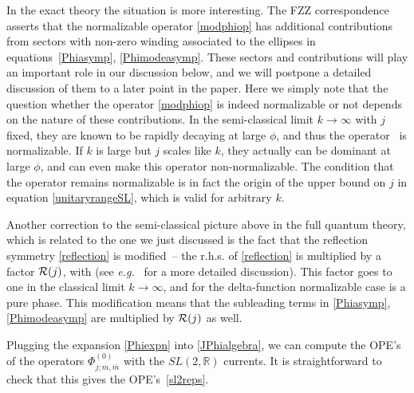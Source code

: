 \documentclass[12pt]{article}
\def\sltwo{\ensuremath{SL(2,\bR)}}
\def\eg{{e.g.}}
\newcommand{\bR}{{\mathbb R}}
\numberwithin{equation}{section}
\def\eg{{\it e.g.}}
\def\eg{{\it e.g.}}
\def\mbar{{\bar m}}
\begin{document}
In the exact theory the situation is more interesting. The FZZ correspondence~ asserts that the normalizable operator \eqref{modphiop} has additional contributions from sectors with non-zero winding associated to the ellipses in equations~\eqref{Phiasymp}, \eqref{Phimodeasymp}. These sectors and contributions will play an important role in our discussion below, and we will postpone a detailed discussion of them to a later point in the paper. Here we simply note that the question whether the operator \eqref{modphiop} is indeed normalizable or not depends on the nature of these contributions. In the semi-classical limit $k\to\infty$ with $j$ fixed, they are known to be rapidly decaying at large $\phi$, and thus the operator \modphiop\ is normalizable. If $k$ is large but $j$ scales like $k$, they actually can be dominant at large $\phi$, and can even make this operator non-normalizable. The condition that the operator remains normalizable is in fact the origin of the upper bound on $j$ in equation \eqref{unitaryrangeSL}, which is valid for arbitrary $k$. 



Another correction to the semi-classical picture above in the full quantum theory, which is related to the one we just discussed is the fact that the reflection symmetry \eqref{reflection} is modified~-- the r.h.s. of \eqref{reflection} is multiplied by a factor $\mathcal {R}(j)$, with
(see \eg~ for a more detailed discussion).
This factor goes to one in the classical limit $k\to\infty$, and for the delta-function normalizable case is a pure phase. This modification means that the subleading terms in \eqref{Phiasymp}, \eqref{Phimodeasymp} are multiplied by $\mathcal {R}(j)$ as well.  

Plugging the expansion \eqref{Phiexpn} into \eqref{JPhialgebra}, we can compute the OPE's of the operators $\Phi_{j;m,\mbar}^{(0)}$ with the $\sltwo$ currents. It is straightforward to check that this gives the OPE's~\eqref{sl2reps}.
\end{document}
